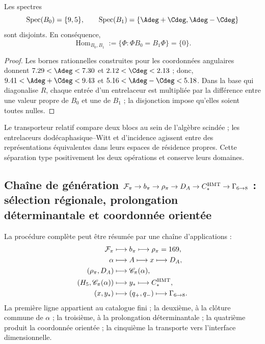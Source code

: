 \begin{theorem}
\label{p12-83-c13-s3:thm:no-go-entrelazador-bloques-split}
Les spectres
\[
 \operatorname{Spec}(B_0)=\{9,5\},\qquad
 \operatorname{Spec}(B_1)=\{\Adeg+\Cdeg,\Adeg-\Cdeg\}
\]
sont disjoints. En conséquence,
\[
 \operatorname{Hom}_{B_0,B_1}
 :=\{\Phi:\Phi B_0=B_1\Phi\}=\{0\}.
\]
\end{theorem}

\begin{proof}
Les bornes rationnelles construites pour les coordonnées angulaires donnent
\(7.29<\Adeg<7.30\) et \(2.12<\Cdeg<2.13\) ; donc,
\(9.41<\Adeg+\Cdeg<9.43\) et
\(5.16<\Adeg-\Cdeg<5.18\). Dans la base qui diagonalise \(R\), chaque entrée
d'un entrelaceur est multipliée par la différence entre une valeur propre
de \(B_0\) et une de \(B_1\) ; la disjonction impose qu'elles soient toutes nulles.
\end{proof}

Le transporteur relatif compare deux blocs au sein de l'algèbre scindée ;
les entrelaceurs dodécaphasique--Witt et d'incidence agissent entre des
représentations équivalentes dans leurs espaces de résidence propres. Cette séparation
type positivement les deux opérations et conserve leurs domaines.

\subsection{Chaîne de génération \(\mathcal F_\pi\to b_\pi\to\rho_\pi\to D_A\to C_*^{\rm HMT}\to\Gamma_{6\to8}\) : sélection régionale, prolongation déterminantale et coordonnée orientée}

La procédure complète peut être résumée par une chaîne d'applications :
\[
\begin{aligned}
\mathcal F_\pi
&\longmapsto b_\pi
\longmapsto\rho_\pi=169,\\
\alpha
&\longmapsto A
\longmapsto x
\longmapsto D_A,\\
(\rho_\pi,D_A)
&\longmapsto\mathscr C_\pi(\alpha),\\
(H_5,\mathscr C_\pi(\alpha))
&\longmapsto y_*
\longmapsto C_*^{\rm HMT},\\
(x,y_*)
&\longmapsto(q_+,q_-)
\longmapsto\Gamma_{6\to8}.
\end{aligned}
\]
La première ligne appartient au catalogue fini ; la deuxième, à la clôture commune de
\(\alpha\) ; la troisième, à la prolongation déterminantale ; la quatrième produit la
coordonnée orientée ; la cinquième la transporte vers l'interface dimensionnelle.

